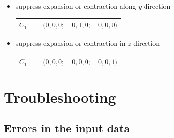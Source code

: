 \documentclass[final,12pt]{article}
\begin{document}
{{{{{{\begin{itemize}
\begin{center}
\begin{tabular}{|cccc|}
\hline
$C_1=($&$1,0,0;$&$ 0,0,0 ;$&$ 0,0,0)$\\
\hline
\end{tabular}
\end{center}
%
\item suppress expansion or contraction along $y$ direction
\begin{center}
\begin{tabular}{|cccc|}
\hline
$C_1=$&$(0,0,0;$&$ 0,1,0 ;$&$ 0,0,0)$\\
\hline
\end{tabular}
\end{center}
%
\item suppress expansion or contraction in $z$ direction
\begin{center}
\begin{tabular}{|cccc|}
\hline
$C_1=$&$(0,0,0;$&$ 0,0,0 ;$&$ 0,0,1)$\\
\hline
\end{tabular}
\end{center}
%
\end{itemize}


\newpage
\section{Troubleshooting}

\subsection{Errors in the input data}

}}}}}}
\end{document}
